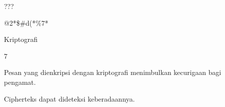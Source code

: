 \documentclass{article}
\begin{document}

???

@2*\$\#d(*\%7*

Kriptografi

7

Pesan yang dienkripsi dengan kriptografi menimbulkan kecurigaan bagi pengamat. 

Cipherteks dapat dideteksi keberadaannya.
\end{document}
